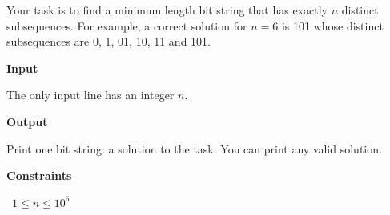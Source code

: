 Your task is to find a minimum length bit string that has exactly $n$ distinct subsequences.
For example, a correct solution for $n=6$ is 101 whose distinct subsequences are 0, 1, 01, 10, 11 and 101.

\vspace{0.3cm}\noindent\textbf{Input}

The only input line has an integer $n$.

\vspace{0.3cm}\noindent\textbf{Output}

Print one bit string: a solution to the task. You can print any valid solution.

\vspace{0.3cm}\noindent\textbf{Constraints}

\textbullet\ $1 \le n \le 10^6$
